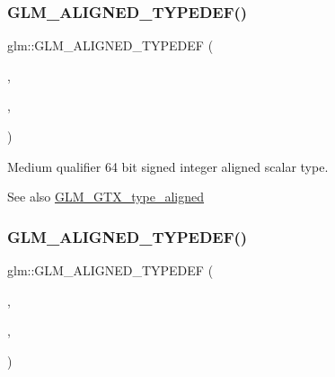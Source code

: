 \subsubsection{\texorpdfstring{G\+L\+M\+\_\+\+A\+L\+I\+G\+N\+E\+D\+\_\+\+T\+Y\+P\+E\+D\+E\+F()}{GLM\_ALIGNED\_TYPEDEF()}\hspace{0.1cm}{\footnotesize\ttfamily [16/209]}}
{\footnotesize\ttfamily glm\+::\+G\+L\+M\+\_\+\+A\+L\+I\+G\+N\+E\+D\+\_\+\+T\+Y\+P\+E\+D\+EF (\begin{DoxyParamCaption}\item[{\hyperlink{group__gtc__type__precision_ga603c695fe5cd677d3f72a81343e19a74}{mediump\+\_\+int64}}]{,  }\item[{aligned\+\_\+mediump\+\_\+int64}]{,  }\item[{8}]{ }\end{DoxyParamCaption})}

Medium qualifier 64 bit signed integer aligned scalar type. \begin{DoxySeeAlso}{See also}
\hyperlink{group__gtx__type__aligned}{G\+L\+M\+\_\+\+G\+T\+X\+\_\+type\+\_\+aligned} 
\end{DoxySeeAlso}
\mbox{\label{group__gtx__type__aligned_ga353fd9fa8a9ad952fcabd0d53ad9a6dd}} 
\subsubsection{\texorpdfstring{G\+L\+M\+\_\+\+A\+L\+I\+G\+N\+E\+D\+\_\+\+T\+Y\+P\+E\+D\+E\+F()}{GLM\_ALIGNED\_TYPEDEF()}\hspace{0.1cm}{\footnotesize\ttfamily [17/209]}}
{\footnotesize\ttfamily glm\+::\+G\+L\+M\+\_\+\+A\+L\+I\+G\+N\+E\+D\+\_\+\+T\+Y\+P\+E\+D\+EF (\begin{DoxyParamCaption}\item[{\hyperlink{group__gtc__type__precision_ga626ac5f73d3538e62a879d6c56abfb36}{mediump\+\_\+int8\+\_\+t}}]{,  }\item[{aligned\+\_\+mediump\+\_\+int8\+\_\+t}]{,  }\item[{1}]{ }\end{DoxyParamCaption})}

